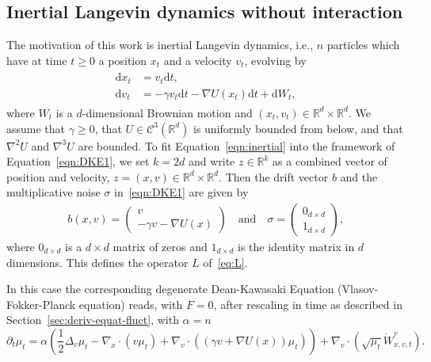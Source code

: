 \documentclass{article}
\newcommand{\dd}{\text{d}}
\newcommand{\R}{\mathbb{R}}
\newcommand{\C}{\mathcal C}
\begin{document}
\subsection{Inertial Langevin dynamics without interaction}
\label{section:langeveinfzero}

The motivation of this work is inertial Langevin dynamics, i.e., $n$ particles which have at time $t \geq 0$ a
position $x_t$ and a velocity $v_t$, evolving by
\begin{align}
  \begin{split}
    \dd x_t &=  v_t \dd t,\\
    \dd v_t &=  - \gamma v_t \dd t - \nabla U(x_t) \dd t + \dd W_t,
  \end{split}
  \label{eqn:inertial}
\end{align}
where $W_t$ is a $d$-dimensional Brownian motion and $(x_t,v_t) \in \R^d \times \R^d$. We assume that
$\gamma \geq 0$, that $U \in \C^3(\R^d)$ is uniformly bounded from below, and that $\nabla^2 U$ and
$\nabla^3 U$ are bounded. To fit Equation~\eqref{eqn:inertial} into the framework of
Equation~\eqref{eqn:DKE1}, we set $k = 2d$ and write $z \in \R^{k}$ as a combined vector of position and
velocity, $z = (x,v) \in \R^d \times \R^d$. Then the drift vector $b$ and the multiplicative noise $\sigma$
in~\eqref{eqn:DKE1} are given by
\begin{align*}
  b(x,v) = \begin{pmatrix}
    v \\ -\gamma v - \nabla U(x)
  \end{pmatrix}\quad
  \text{and} \quad
  \sigma = \begin{pmatrix} 0_{d \times d} \\ 1_{d \times d}\end{pmatrix},
\end{align*}
where $0_{d \times d}$ is a $d \times d$ matrix of zeros and $1_{d\times d}$ is the identity matrix in $d$
dimensions. This defines the operator $L$ of~\eqref{eq:L}.

In this case the corresponding degenerate Dean-Kawasaki Equation (Vlasov-Fokker-Planck equation) reads, with
$F = 0$, after rescaling in time as described in Section~\ref{sec:deriv-equat-fluct}, with $\alpha=n$
\begin{equation*}
  \partial_t \mu_t =  \alpha\left(\frac 1 2\Delta_v \mu_t -  \nabla_x \cdot (v \mu_t) + \nabla_v
  \cdot( (\gamma v + \nabla U(x)) \mu_t) \right) + \nabla_v \cdot (\sqrt{\mu_t} \dot W_{x,v,t}^v).
\end{equation*}
\end{document}
